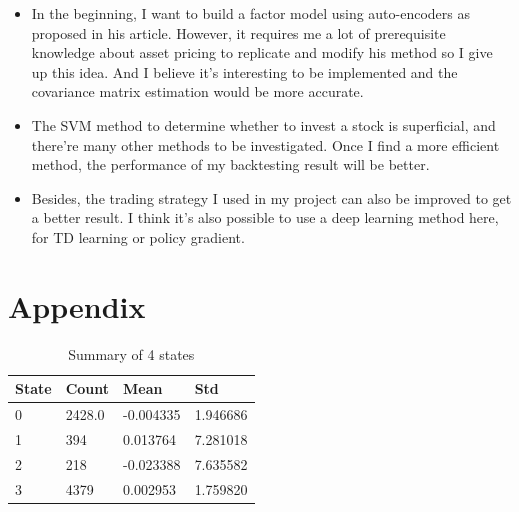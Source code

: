 \documentclass[a4paper,12pt]{article}
\begin{document}
\begin{itemize}
    \item In the beginning, I want to build a factor model using auto-encoders as \cite{gu_autoencoder_2021} proposed in his article. However, it requires me a lot of prerequisite knowledge about asset pricing to replicate and modify his method so I give up this idea. And I believe it's interesting to be implemented and the covariance matrix estimation would be more accurate.
    \item The SVM method to determine whether to invest a stock is superficial, and there're many other methods to be investigated. Once I find a more efficient method, the performance of my backtesting result will be better.
    \item Besides, the trading strategy I used in my project can also be improved to get a better result. I think it's also possible to use a deep learning method here, for TD learning or policy gradient.
\end{itemize}

\section{Appendix}

\begin{table}[H]
    \centering
    \begin{tabular}{|l|l|l|l|}
    \hline
    State & Count  & Mean                           & Std                           \\ \hline
    0     & 2428.0 & -0.004335                      & \multicolumn{1}{r|}{1.946686} \\ \hline
    1     & 394    & 0.013764                       & 7.281018                      \\ \hline
    2     & 218    & \multicolumn{1}{r|}{-0.023388} & 7.635582                      \\ \hline
    3     & 4379   & 0.002953                       & \multicolumn{1}{r|}{1.759820} \\ \hline
    \end{tabular}
    \caption{Summary of 4 states}
    \label{table_4states}
\end{table}




\end{document}
